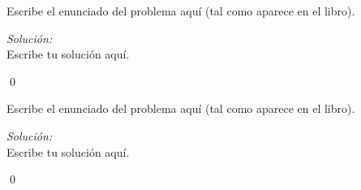 \documentclass[12pt]{article}
\newenvironment{problema}[2][Problema]{\begin{trivlist}
		\item[\hskip \labelsep {\bfseries #1}\hskip \labelsep {\bfseries #2.}]}{\end{trivlist}}
\newenvironment{solucion}
{\emph{Soluci\'on:}\\
}
{
	\qed
}
\begin{document}
	
	\begin{problema}{x.y.z} 
		Escribe el enunciado del problema aquí (tal como aparece en el libro).
	\end{problema}
	\begin{solucion}
		Escribe tu solución aquí.
	\end{solucion}
	
	\begin{problema}{x.y.z}
		Escribe el enunciado del problema aquí (tal como aparece en el libro).
	\end{problema}
	\begin{solucion}
		Escribe tu solución aquí.
	\end{solucion}
		
\end{document}
